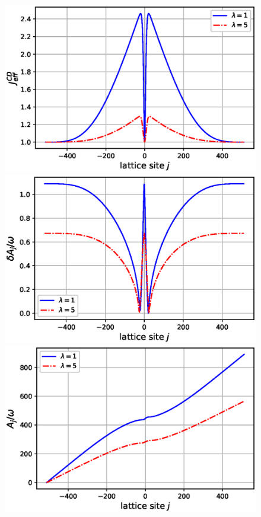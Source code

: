 \documentclass[11pt,a4paper]{article}
\begin{document}
\begin{figure}[!ht]
\begin{center}
\includegraphics[scale=0.5]{pics/j_eff_cd_eckart_potn.eps}
\includegraphics[scale=0.5]{pics/driving_field_amplitude_diff_eckart_potn.eps}
\includegraphics[scale=0.5]{pics/driving_field_amplitude_eckart_potn.eps}

\end{center}
\end{figure}
\end{document}
